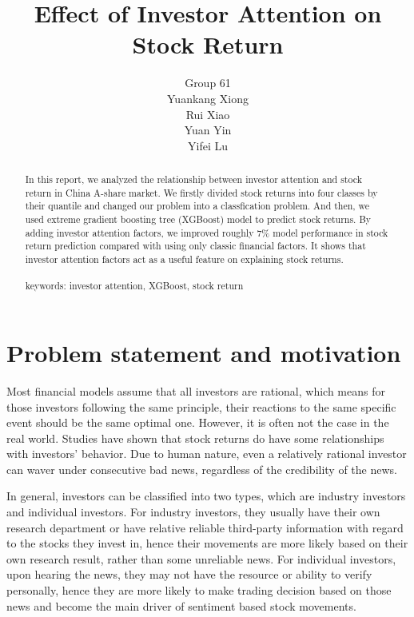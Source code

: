 \documentclass[letterpaper]{article}
\title{Effect of Investor Attention on Stock Return}
\author{%
Group 61\\
  Yuankang Xiong\\
  Rui Xiao\\
  Yuan Yin\\
  Yifei Lu
}
\begin{document}

\maketitle

\begin{abstract}
  In this report, we analyzed the relationship between investor attention and stock return in China A-share market. We firstly divided stock returns into four classes by their quantile and changed our problem into a classfication problem. And then, we used extreme gradient boosting tree (XGBoost) model to predict stock returns. By adding investor attention factors, we improved roughly 7\% model performance in stock return prediction compared with using only classic financial factors. It shows that investor attention factors act as a useful feature on explaining stock returns.\\
\\
  keywords: investor attention, XGBoost, stock return
\end{abstract}

\section{Problem statement and motivation}
\label{statement}

Most financial models assume that all investors are rational, which means for those investors following the same principle, their reactions to the same specific event should be the same optimal one. However, it is often not the case in the real world. Studies have shown that stock returns do have some relationships with investors' behavior. Due to human nature, even a relatively rational investor can waver under consecutive bad news, regardless of the credibility of the news. 

In general, investors can be classified into two types, which are industry investors and individual investors. For industry investors, they usually have their own research department or have relative reliable third-party information with regard to the stocks they invest in, hence their movements are more likely based on their own research result, rather than some unreliable news. For individual investors, upon hearing the news, they may not have the resource or ability to verify personally, hence they are more likely to make trading decision based on those news and become the main driver of sentiment based stock movements.
\end{document}
